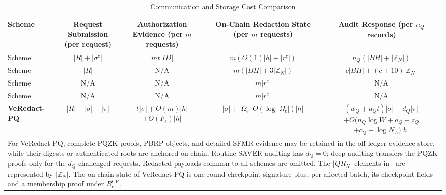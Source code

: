 \documentclass[lettersize,journal]{IEEEtran}
\begin{document}
\begin{table}[t]
\centering
\caption{Communication and Storage Cost Comparison}
\label{tab:comm-cost}
\footnotesize
\renewcommand{\arraystretch}{1.25}
\renewcommand{\cellset}{\renewcommand{\arraystretch}{1.45}}
\setlength{\tabcolsep}{3.2pt}
\begin{adjustbox}{max width=\textwidth}
\begin{tabular}{lcccc}
\toprule
\textbf{Scheme} &
\makecell{\textbf{Request Submission}\\\textbf{(per request)}} &
\makecell{\textbf{Authorization Evidence}\\\textbf{(per $m$ requests)}} &
\makecell{\textbf{On-Chain Redaction State}\\\textbf{(per $m$ requests)}} &
\makecell{\textbf{Audit Response}\\\textbf{(per $n_Q$ records)}} \\
\midrule

Scheme~\cite{ref1}
& $|R|+|\sigma^{c}|$
& $mt|ID|$
& $m(O(1)|h|+|r^{c}|)$
& $n_Q(|BH|+|\mathbb{Z}_N|)$ \\

Scheme~\cite{ref13}
& $|R|$
& N/A
& $m(|BH|+3|\mathbb{Z}_N|)$
& $c|BH|+(c+10)|\mathbb{Z}_N|$ \\

Scheme~\cite{ref27}
& N/A
& N/A
& $m|r^{c}|$
& N/A \\

Scheme~\cite{ref34}
& N/A
& N/A
& $m|r^{c}|$
& N/A \\

\midrule
\textbf{VeRedact-PQ}
& $|R|+|\sigma|+|\pi|$
& \makecell{$t|\sigma|+O(m)|h|$\\
$+O(F_e)|h|$}
& $|\sigma|+|\Omega_e|\,O(\log|\Omega_e|)|h|$
& \makecell{$(w_Q+a_Qt)|\sigma|+d_Q|\pi|$\\
$+O(n_Q\log W+a_Q+z_Q$\\
$+c_Q+\log N_A)|h|$} \\

\bottomrule
\multicolumn{5}{p{0.96\textwidth}}{\footnotesize
For VeRedact-PQ, complete PQZK proofs, PBRP objects, and detailed SFMR
evidence may be retained in the off-ledger evidence store, while their
digests or authenticated roots are anchored on-chain. Routine SAVER
auditing has $d_Q=0$; deep auditing transfers the PQZK proofs only for
the $d_Q$ challenged requests. Redacted payloads common to all schemes
are omitted. The $|QR_N|$ elements in~\cite{ref13} are represented by
$|\mathbb{Z}_N|$. The on-chain state of VeRedact-PQ is one
round checkpoint signature plus, per affected batch, its checkpoint
fields and a membership proof under $R_e^{\mathrm{CP}}$.}
\end{tabular}
\end{adjustbox}
\end{table}
\end{document}
